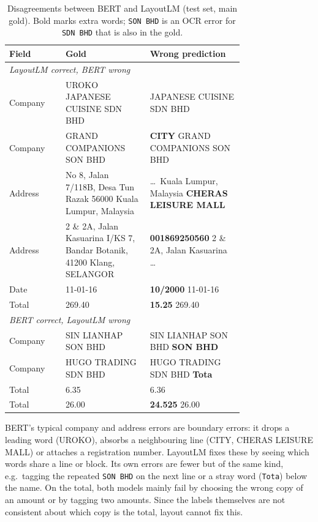 \begin{table}[t]
  \centering
  \small
  \begin{tabular}{lp{0.36\linewidth}p{0.40\linewidth}}
    \toprule
    Field & Gold & Wrong prediction \\
    \midrule
    \multicolumn{3}{l}{\emph{LayoutLM correct, BERT wrong}} \\
    Company & UROKO JAPANESE CUISINE SDN BHD & JAPANESE CUISINE SDN BHD \\
    Company & GRAND COMPANIONS SON BHD & \textbf{CITY} GRAND COMPANIONS SON BHD \\
    Address & No 8, Jalan 7/118B, Desa Tun Razak 56000 Kuala Lumpur, Malaysia
            & \ldots\ Kuala Lumpur, Malaysia \textbf{CHERAS LEISURE MALL} \\
    Address & 2 \& 2A, Jalan Kasuarina I/KS 7, Bandar Botanik, 41200 Klang, SELANGOR
            & \textbf{001869250560} 2 \& 2A, Jalan Kasuarina \ldots \\
    Date    & 11-01-16 & \textbf{10/2000} 11-01-16 \\
    Total   & 269.40 & \textbf{15.25} 269.40 \\
    \midrule
    \multicolumn{3}{l}{\emph{BERT correct, LayoutLM wrong}} \\
    Company & SIN LIANHAP SON BHD & SIN LIANHAP SON BHD \textbf{SON BHD} \\
    Company & HUGO TRADING SDN BHD & HUGO TRADING SDN BHD \textbf{Tota} \\
    Total   & 6.35 & 6.36 \\
    Total   & 26.00 & \textbf{24.525} 26.00 \\
    \bottomrule
  \end{tabular}
  \caption{Disagreements between BERT and LayoutLM (test set, main gold).
  Bold marks extra words; \texttt{SON BHD} is an OCR error for
  \texttt{SDN BHD} that is also in the gold.}
  \label{tab:errors}
\end{table}

BERT's typical company and address errors are boundary errors: it drops
a leading word (UROKO), absorbs a neighbouring line (CITY, CHERAS
LEISURE MALL) or attaches a registration number. LayoutLM fixes these by
seeing which words share a line or block. Its own errors are fewer but
of the same kind, e.g.\ tagging the repeated \texttt{SON BHD} on the
next line or a stray word (\texttt{Tota}) below the name. On the total,
both models mainly fail by choosing the wrong copy of an amount or by
tagging two amounts. Since the labels themselves are not consistent
about which copy is the total, layout cannot fix this.
